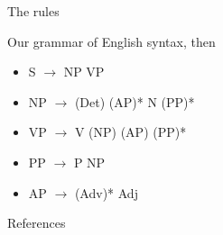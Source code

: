 \documentclass{beamer}
\newcommand{\subonethree}{The rules}
\begin{document}
      \begin{frame}{\subonethree}
        \begin{block}{}
          Our grammar of English syntax, then
        \end{block}
        \begin{block}{}
          \begin{itemize}
            \item S $\rightarrow$ NP VP
            \item NP $\rightarrow$ (Det) (AP)* N (PP)*
            \item VP $\rightarrow$ V (NP) (AP) (PP)*
            \item PP $\rightarrow$ P NP
            \item AP $\rightarrow$ (Adv)* Adj
          \end{itemize}
        \end{block}
      \end{frame}

      \begin{frame}{References}
        \printbibliography
      \end{frame}
\end{document}
